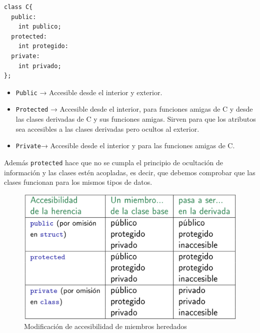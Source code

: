 \begin{minipage}[t]{0.3\textwidth}
	\begin{lstlisting}[frame=single]
class C{
  public:
    int publico;
  protected:
    int protegido:
  private:
    int privado;
};
	\end{lstlisting}
\end{minipage}
\hfill
\begin{minipage}[t]{0.7\textwidth}
	\begin{itemize}
		\item \texttt{Public} → Accesible desde el interior y exterior.\\

		\item \texttt{Protected} → Accesible desde el interior, para funciones amigas de C y desde las clases derivadas de C y sus funciones amigas. 
			Sirven para que los atributos sea accesibles a las clases derivadas pero ocultos al exterior.\\

		\item \texttt{Private}→ Accesible desde el interior y para las funciones amigas de C.\\
	\end{itemize}
\end{minipage}

Además \texttt{protected} hace que no se cumpla el principio de ocultación de información y las clases estén acopladas, es decir, que debemos comprobar que las clases funcionan para los mismos tipos de datos.

\newpage
\begin{center}
	\begin{figure}[h]
	\includegraphics[width=\textwidth]{Imagenes/gen4.png}
	\caption{Modificación de accesibilidad de miembros heredados}
\end{figure}
\end{center}
\vspace*{-1cm}
